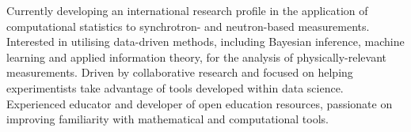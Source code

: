 \vspace{0.25cm}

\begin{cvparagraph}

Currently developing an international research profile in the application of computational statistics to synchrotron- and neutron-based measurements. 
Interested in utilising data-driven methods, including Bayesian inference, machine learning and applied information theory, for the analysis of physically-relevant measurements.
Driven by collaborative research and focused on helping experimentists take advantage of tools developed within data science. 
Experienced educator and developer of open education resources, passionate on improving familiarity with mathematical and computational tools.
\end{cvparagraph}